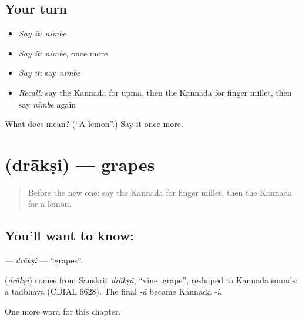\subsection*{Your turn}
\begin{itemize}
\raggedright
  \item \emph{Say it:} \emph{nimbe}
  \item \emph{Say it:} \emph{nimbe}, once more
  \item \emph{Say it:} say \emph{nimbe}
  \item \emph{Recall:} say the Kannada for upma, then the Kannada for finger millet, then say \emph{nimbe} again
\end{itemize}

\begin{tcolorbox}[breakable,colback=teal!4,colframe=teal!35!black,title={Before you move on}]
What does  mean? (\textquotedblleft{}A lemon\textquotedblright{}.) Say it once more.
\end{tcolorbox}
\section[\texorpdfstring{\kn{ದ್ರಾಕ್ಷಿ} (drākṣi)}{ದ್ರಾಕ್ಷಿ (drākṣi)}]{ (drākṣi) — grapes}

\label{lesson:KA-C126-draksi}



\begin{quote}
Before the new one: say the Kannada for finger millet, then the Kannada for a lemon.
\end{quote}

\subsection*{You'll want to know: }
\textbf{} — \emph{drākṣi} — \textquotedblleft{}grapes\textquotedblright{}.

\begin{cousinweb}
\textbf{} (\emph{drākṣi}) comes from Sanskrit \emph{drākṣā}, \textquotedblleft{}vine, grape\textquotedblright{}, reshaped to Kannada sounds: a tadbhava (CDIAL 6628). The final \emph{-ā} became Kannada \emph{-i}.
\end{cousinweb}

\begin{grammarlens}[title={What you've built}]
One more word for this chapter.
\end{grammarlens}

